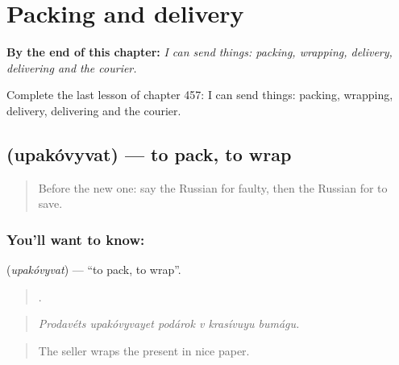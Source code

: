 
\chapter{Packing and delivery}
\label{ch:ru-packing-and-delivery}

\begin{chapteropening}
\textbf{By the end of this chapter:} \emph{I can send things: packing, wrapping, delivery, delivering and the courier.}

Complete the last lesson of chapter 457: I can send things: packing, wrapping, delivery, delivering and the courier.
\end{chapteropening}

\section[\texorpdfstring{\ru{упаковывать} (upakóvyvat)}{упаковывать (upakóvyvat)}]{ (upakóvyvat) — to pack, to wrap}

\label{lesson:RU-C457-upakovyvat}



\begin{quote}
Before the new one: say the Russian for faulty, then the Russian for to save.
\end{quote}

\subsection*{You'll want to know: }
\textbf{} (\emph{upakóvyvat}) — \textquotedblleft{}to pack, to wrap\textquotedblright{}.

\begin{quote}
     .
\end{quote}

\begin{quote}
\emph{Prodavéts upakóvyvayet podárok v krasívuyu bumágu.}
\end{quote}

\begin{quote}
The seller wraps the present in nice paper.
\end{quote}

